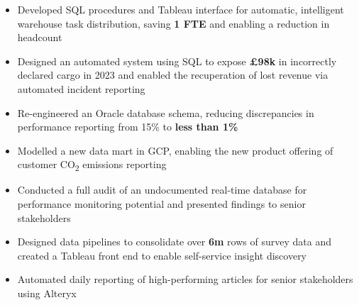 \begin{paracol}{2}
        \divider

        \begin{itemize}
            \item Developed SQL procedures and Tableau interface for automatic, intelligent warehouse task distribution, saving \textbf{1 FTE} and enabling a reduction in headcount
            \item Designed an automated system using SQL to expose \textbf{£98k} in incorrectly declared cargo in 2023 and enabled the recuperation of lost revenue via automated incident reporting
            \item Re-engineered an Oracle database schema, reducing discrepancies in performance reporting from 15\% to \textbf{less than 1\%}
            \item Modelled a new data mart in GCP, enabling the new product offering of customer CO\textsubscript{2} emissions reporting
            \item Conducted a full audit of an undocumented real-time database for performance monitoring potential and presented findings to senior stakeholders
            \\\medskip
               
        \end{itemize}

        \divider

        \begin{itemize}
            \item Designed data pipelines to consolidate over \textbf{6m} rows of survey data and created a Tableau front end to enable self-service insight discovery
            \item Automated daily reporting of high-performing articles for senior stakeholders using Alteryx
            \\\medskip
               
        \end{itemize}


\end{paracol}
